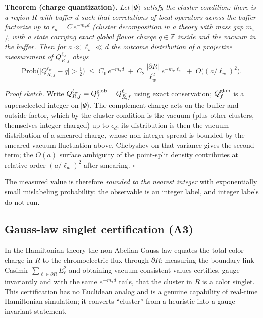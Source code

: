 \medskip
\noindent\textbf{Theorem (charge quantization).}
\emph{Let $|\Psi\rangle$ satisfy the cluster condition: there is a region
$R$ with buffer $d$ such that correlations of local operators across the
buffer factorize up to $\epsilon_d = C\,e^{-m_\pi d}$ (cluster
decomposition in a theory with mass gap $m_\pi$), with a state carrying
exact global flavor charge $q\in\mathbb Z$ inside and the vacuum in the
buffer.  Then for $a\ll\ell_w\ll d$ the outcome distribution of a
projective measurement of $Q^{\ell_w}_{R,f}$ obeys}
\begin{equation}
\mathrm{Prob}\Big(\big|Q^{\ell_w}_{R,f}-q\big|>\tfrac12\Big)
\;\le\; C_1\,e^{-m_\pi d}
\;+\; C_2\,\frac{|\partial R|}{\ell_w^2}\,e^{-m_\pi\ell_w}
\;+\; O\!\big((a/\ell_w)^2\big).
\label{eq:quantization}
\end{equation}

\emph{Proof sketch.}  Write $Q^{\ell_w}_{R,f}=Q^{\rm glob}_f-
Q^{\ell_w}_{\bar R,f}$ using exact conservation; $Q^{\rm glob}_f$ is a
superselected integer on $|\Psi\rangle$.  The complement charge acts on
the buffer-and-outside factor, which by the cluster condition is the
vacuum (plus other clusters, themselves integer-charged) up to
$\epsilon_d$; its distribution is then the vacuum distribution of a
smeared charge, whose non-integer spread is bounded by the smeared
vacuum fluctuation above.  Chebyshev on that variance gives the second
term; the $O(a)$ surface ambiguity of the point-split density contributes
at relative order $(a/\ell_w)^2$ after smearing.  \hfill$\square$

\medskip
The measured value is therefore \emph{rounded to the nearest integer}
with exponentially small mislabeling probability: the observable is an
integer label, and integer labels do not run.

\subsection{Gauss-law singlet certification (A3)}

In the Hamiltonian theory the non-Abelian Gauss law equates the total
color charge in $R$ to the chromoelectric flux through $\partial R$:
measuring the boundary-link Casimir $\sum_{\ell\in\partial R}E_\ell^2$
and obtaining vacuum-consistent values certifies, gauge-invariantly and
with the same $e^{-m_\pi d}$ tails, that the cluster in $R$ is a color
singlet.  This certification has no Euclidean analog and is a genuine
capability of real-time Hamiltonian simulation; it converts ``cluster''
from a heuristic into a gauge-invariant statement.

